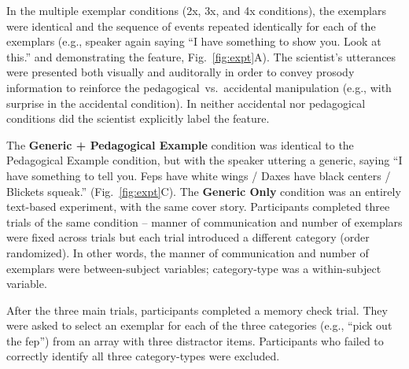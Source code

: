 \documentclass[10pt,letterpaper]{article}
\newcommand{\soph}[1]{\textcolor{Green}{[sb: #1]}}
\begin{document}
In the multiple exemplar conditions (2x, 3x, and 4x conditions), the exemplars were identical and the sequence of events repeated identically for each of the exemplars (e.g., speaker again saying ``I have something to show you. Look at this.'' and demonstrating the feature, Fig.~\ref{fig:expt}A).
The scientist's utterances were presented both visually and auditorally in order to convey prosody information to reinforce the pedagogical~vs.~accidental manipulation (e.g., with surprise in the accidental condition).
In neither accidental nor pedagogical conditions did the scientist explicitly label the feature. 


The \textbf{Generic + Pedagogical Example} condition was identical to the Pedagogical Example condition, but with the speaker uttering a generic, saying ``I have something to tell you. Feps have white wings / Daxes have black centers / Blickets squeak.'' (Fig.~\ref{fig:expt}C). 
The \textbf{Generic Only} condition was an entirely text-based experiment, with the same cover story. 
Participants completed three trials of the same condition -- manner of communication and number of exemplars were fixed across trials but each trial introduced a different category (order randomized). In other words, the manner of communication and number of exemplars were between-subject variables; category-type was a within-subject variable. 

After the three main trials, participants completed a memory check trial. They were asked to select an exemplar for each of the three categories (e.g., ``pick out the fep'') from an array with three distractor items. 
Participants who failed to correctly identify all three category-types were excluded.


\end{document}
